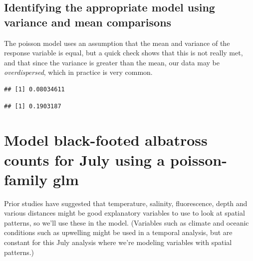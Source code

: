 \documentclass[
]{book}
\newenvironment{Shaded}{\begin{snugshade}}{\end{snugshade}}
\newcommand{\FunctionTok}[1]{\textcolor[rgb]{0,0,0}{#1}}
\newcommand{\NormalTok}[1]{#1}
\newcommand{\SpecialCharTok}[1]{\textcolor[rgb]{0,0,0}{#1}}
\begin{document}
\hypertarget{identifying-the-appropriate-model-using-variance-and-mean-comparisons}{%
\subsection{Identifying the appropriate model using variance and mean comparisons}\label{identifying-the-appropriate-model-using-variance-and-mean-comparisons}}

The poisson model uses an assumption that the mean and variance of the response variable is equal, but a quick check shows that this is not really met, and that since the variance is greater than the mean, our data may be \emph{overdispersed}, which in practice is very common.

\begin{Shaded}
\end{Shaded}

\begin{verbatim}
## [1] 0.08034611
\end{verbatim}

\begin{Shaded}
\end{Shaded}

\begin{verbatim}
## [1] 0.1903187
\end{verbatim}

\hypertarget{model-black-footed-albatross-counts-for-july-using-a-poisson-family-glm}{%
\section{Model black-footed albatross counts for July using a poisson-family glm}\label{model-black-footed-albatross-counts-for-july-using-a-poisson-family-glm}}

Prior studies have suggested that temperature, salinity, fluorescence, depth and various distances might be good explanatory variables to use to look at spatial patterns, so we'll use these in the model. (Variables such as climate and oceanic conditions such as upwelling might be used in a temporal analysis, but are constant for this July analysis where we're modeling variables with spatial patterns.)
\end{document}
